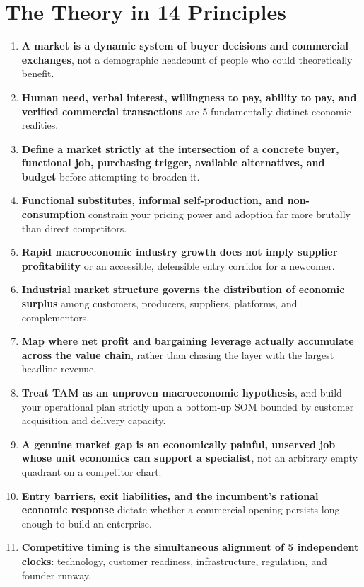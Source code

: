 \section*{The Theory in 14 Principles}

\begin{enumerate}[leftmargin=16pt,itemsep=3pt,topsep=2pt]
  \item \textbf{A market is a dynamic system of buyer decisions and commercial exchanges}, not a demographic headcount of people who could theoretically benefit.
  \item \textbf{Human need, verbal interest, willingness to pay, ability to pay, and verified commercial transactions} are 5 fundamentally distinct economic realities.
  \item \textbf{Define a market strictly at the intersection of a concrete buyer, functional job, purchasing trigger, available alternatives, and budget} before attempting to broaden it.
  \item \textbf{Functional substitutes, informal self-production, and non-consumption} constrain your pricing power and adoption far more brutally than direct competitors.
  \item \textbf{Rapid macroeconomic industry growth does not imply supplier profitability} or an accessible, defensible entry corridor for a newcomer.
  \item \textbf{Industrial market structure governs the distribution of economic surplus} among customers, producers, suppliers, platforms, and complementors.
  \item \textbf{Map where net profit and bargaining leverage actually accumulate across the value chain}, rather than chasing the layer with the largest headline revenue.
  \item \textbf{Treat TAM as an unproven macroeconomic hypothesis}, and build your operational plan strictly upon a bottom-up SOM bounded by customer acquisition and delivery capacity.
  \item \textbf{A genuine market gap is an economically painful, unserved job whose unit economics can support a specialist}, not an arbitrary empty quadrant on a competitor chart.
  \item \textbf{Entry barriers, exit liabilities, and the incumbent's rational economic response} dictate whether a commercial opening persists long enough to build an enterprise.
  \item \textbf{Competitive timing is the simultaneous alignment of 5 independent clocks}: technology, customer readiness, infrastructure, regulation, and founder runway.

\end{enumerate}
